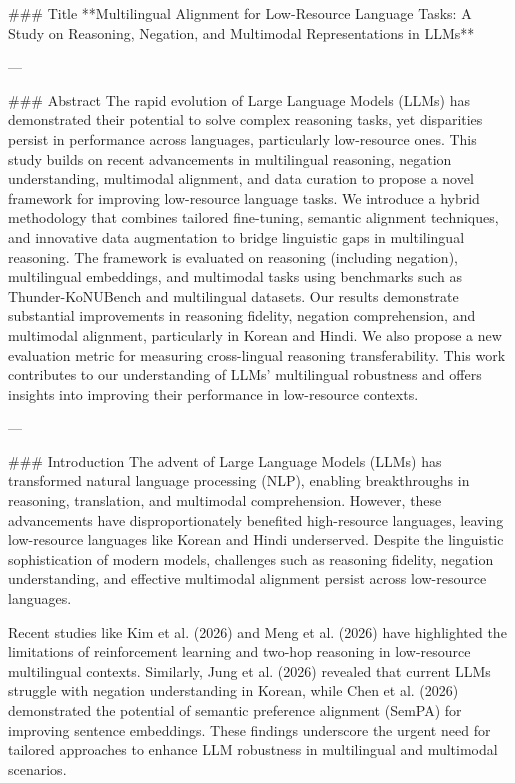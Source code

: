 ### Title
**Multilingual Alignment for Low-Resource Language Tasks: A Study on Reasoning, Negation, and Multimodal Representations in LLMs**

---

### Abstract
The rapid evolution of Large Language Models (LLMs) has demonstrated their potential to solve complex reasoning tasks, yet disparities persist in performance across languages, particularly low-resource ones. This study builds on recent advancements in multilingual reasoning, negation understanding, multimodal alignment, and data curation to propose a novel framework for improving low-resource language tasks. We introduce a hybrid methodology that combines tailored fine-tuning, semantic alignment techniques, and innovative data augmentation to bridge linguistic gaps in multilingual reasoning. The framework is evaluated on reasoning (including negation), multilingual embeddings, and multimodal tasks using benchmarks such as Thunder-KoNUBench and multilingual datasets. Our results demonstrate substantial improvements in reasoning fidelity, negation comprehension, and multimodal alignment, particularly in Korean and Hindi. We also propose a new evaluation metric for measuring cross-lingual reasoning transferability. This work contributes to our understanding of LLMs' multilingual robustness and offers insights into improving their performance in low-resource contexts.

---

### Introduction
The advent of Large Language Models (LLMs) has transformed natural language processing (NLP), enabling breakthroughs in reasoning, translation, and multimodal comprehension. However, these advancements have disproportionately benefited high-resource languages, leaving low-resource languages like Korean and Hindi underserved. Despite the linguistic sophistication of modern models, challenges such as reasoning fidelity, negation understanding, and effective multimodal alignment persist across low-resource languages.

Recent studies like Kim et al. (2026) and Meng et al. (2026) have highlighted the limitations of reinforcement learning and two-hop reasoning in low-resource multilingual contexts. Similarly, Jung et al. (2026) revealed that current LLMs struggle with negation understanding in Korean, while Chen et al. (2026) demonstrated the potential of semantic preference alignment (SemPA) for improving sentence embeddings. These findings underscore the urgent need for tailored approaches to enhance LLM robustness in multilingual and multimodal scenarios.


